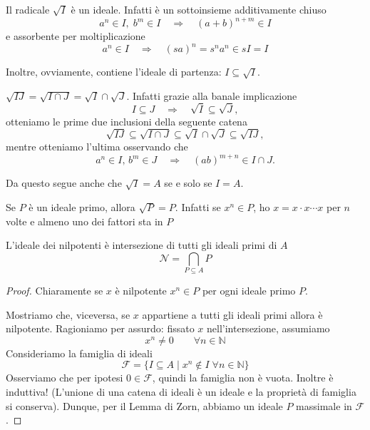 \begin{multicols}{2}
\begin{remark}
Il radicale $ \sqrt{I} $ è un ideale. Infatti è un sottoinsieme additivamente chiuso
\[ a^n \in I,\;  b^m \in I \quad\Rightarrow\quad (a+b)^{n+m} \in I \]
e assorbente per moltiplicazione
\[ a^n \in I \quad\Rightarrow\quad (sa)^{n} = s^na^n \in sI = I \]

Inoltre, ovviamente, contiene l'ideale di partenza: $ I \subseteq \sqrt{I} $.
\end{remark}


\begin{remark}
	$ \sqrt{IJ} = \sqrt{I \cap J} = \sqrt{I} \cap \sqrt{J}  $. Infatti grazie alla banale implicazione
	\[ I \subseteq J \quad\Rightarrow\quad \sqrt{I} \subseteq \sqrt{J}, \]
	otteniamo le prime due inclusioni della seguente catena
	\[ \sqrt{IJ} \subseteq \sqrt{I \cap J} \subseteq \sqrt{I} \cap \sqrt{J} \subseteq \sqrt{IJ}, \]
	mentre otteniamo l'ultima osservando che
	\[ a^n \in I,\, b^m \in J \quad\Rightarrow\quad (ab)^{m + n} \in I \cap J .\]
	
	Da questo segue anche che $ \sqrt{I} = A $ se e solo se $ I = A $.
\end{remark}
\begin{remark}
	Se $ P $ è un ideale primo, allora $ \boxed{\sqrt{P} = P} $. Infatti se $ x^n \in P $, ho $ x = x \cdot x \cdots x $ per $ n $ volte e almeno uno dei fattori sta in $ P $
\end{remark}

\begin{prop}
	L'ideale dei nilpotenti è intersezione di tutti gli ideali primi di $ A $
	$$  \mathcal{N} = \bigcap_{P \subseteq A} P  $$
\end{prop}
\begin{proof}
	Chiaramente se $ x $ è nilpotente $ x ^n \in P $ per ogni ideale primo $ P $.
	
	Mostriamo che, viceversa, se $ x $ appartiene a tutti gli ideali primi allora è nilpotente. Ragioniamo per assurdo: fissato $ x $ nell'intersezione, assumiamo $$  x^n \neq 0 \qquad \forall n \in \mathbb{N} $$ Consideriamo la famiglia di ideali
	$$  \mathcal{F} = \{ I \subseteq A \mid x^n \notin I \;\forall n \in \mathbb{N}  \}  $$
	Osserviamo che per ipotesi $ {0} \in \mathcal{F} $, quindi la famiglia non è vuota. Inoltre è induttiva! (L'unione di una catena di ideali è un ideale e la proprietà di famiglia si conserva). Dunque, per il Lemma di Zorn, abbiamo un ideale $ P $ massimale in $ \mathcal F $.
	

\end{proof}
\end{multicols}
